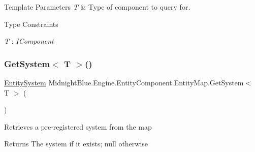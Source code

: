 \begin{DoxyTemplParams}{Template Parameters}
{\em T} & Type of component to query for.\\
\hline
\end{DoxyTemplParams}
\begin{Desc}
\item[Type Constraints]\begin{description}
\item[{\em T} : {\em I\+Component}]\end{description}
\end{Desc}
\hypertarget{class_midnight_blue_1_1_engine_1_1_entity_component_1_1_entity_map_ade1ba7fa7fd3e4e3d0610b9bd382587e}{}\label{class_midnight_blue_1_1_engine_1_1_entity_component_1_1_entity_map_ade1ba7fa7fd3e4e3d0610b9bd382587e} 
\subsubsection{\texorpdfstring{Get\+System$<$ T $>$()}{GetSystem< T >()}}
{\footnotesize\ttfamily \hyperlink{class_midnight_blue_1_1_engine_1_1_entity_component_1_1_entity_system}{Entity\+System} Midnight\+Blue.\+Engine.\+Entity\+Component.\+Entity\+Map.\+Get\+System$<$ T $>$ (\begin{DoxyParamCaption}{ }\end{DoxyParamCaption})\hspace{0.3cm}{\ttfamily [inline]}}



Retrieves a pre-\/registered system from the map 

\begin{DoxyReturn}{Returns}
The system if it exists; null otherwise
\end{DoxyReturn}

